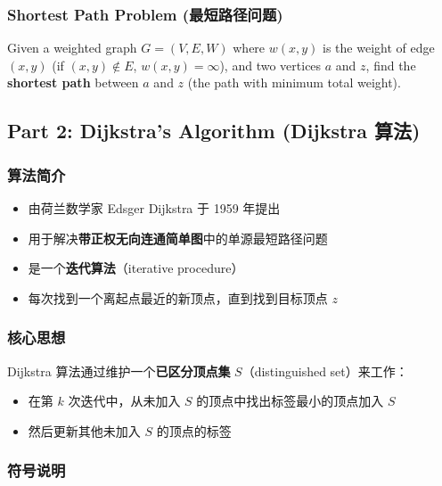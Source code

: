 \documentclass[10pt,a4paper,openany]{ctexbook}
\theoremstyle{definition}
\theoremstyle{remark}
\renewenvironment{quote}
  {\list{}{\leftmargin=1em\rightmargin=0pt\topsep=0.5pt\partopsep=0pt}\item[]}
  {\endlist}
\begin{document}
\subsubsection{Shortest Path Problem (最短路径问题)}

\begin{quote}
Given a weighted graph $G = (V, E, W)$ where $w(x, y)$ is the weight of edge $(x, y)$ (if $(x, y) \notin E$, $w(x, y) = \infty$), and two vertices $a$ and $z$, find the \textbf{shortest path} between $a$ and $z$ (the path with minimum total weight).

\end{quote}
\vspace{-2pt}

\subsection{Part 2: Dijkstra's Algorithm (Dijkstra 算法)}

\subsubsection{算法简介}

\begin{itemize}
\item 由荷兰数学家 Edsger Dijkstra 于 1959 年提出
\item 用于解决\textbf{带正权无向连通简单图}中的单源最短路径问题
\item 是一个\textbf{迭代算法}（iterative procedure）
\item 每次找到一个离起点最近的新顶点，直到找到目标顶点 $z$

\end{itemize}

\subsubsection{核心思想}

Dijkstra 算法通过维护一个\textbf{已区分顶点集} $S$（distinguished set）来工作：
\begin{itemize}
\item 在第 $k$ 次迭代中，从未加入 $S$ 的顶点中找出标签最小的顶点加入 $S$
\item 然后更新其他未加入 $S$ 的顶点的标签

\end{itemize}

\subsubsection{符号说明}
\end{document}

